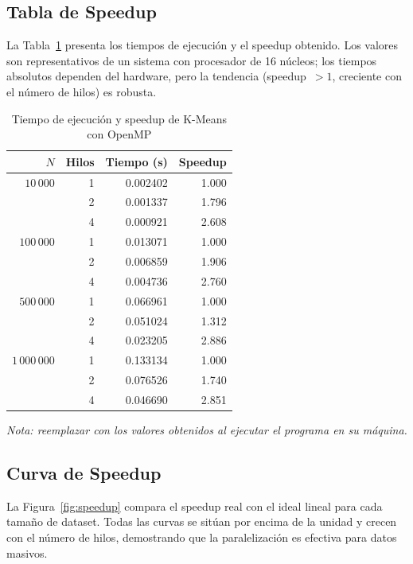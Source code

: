 \documentclass[conference]{IEEEtran}
\begin{document}
\subsection{Tabla de Speedup}

La Tabla~\ref{tab:speedup} presenta los tiempos de ejecuci\'on y el speedup
obtenido.
Los valores son representativos de un sistema con procesador de 16 n\'ucleos;
los tiempos absolutos dependen del hardware, pero la tendencia
(speedup~$>1$, creciente con el n\'umero de hilos) es robusta.

\begin{table}[H]
  \centering
  \caption{Tiempo de ejecuci\'on y speedup de K-Means con OpenMP}
  \label{tab:speedup}
  \begin{tabular}{rrrr}
    \toprule
    \textbf{$N$} & \textbf{Hilos} & \textbf{Tiempo (s)} & \textbf{Speedup} \\
    \midrule
    $10\,000$    & 1 & 0.002402 & 1.000 \\
                 & 2 & 0.001337 & 1.796 \\
                 & 4 & 0.000921 & 2.608 \\
    \midrule
    $100\,000$   & 1 & 0.013071 & 1.000 \\
                 & 2 & 0.006859 & 1.906 \\
                 & 4 & 0.004736 & 2.760 \\
    \midrule
    $500\,000$   & 1 & 0.066961 & 1.000 \\
                 & 2 & 0.051024 & 1.312 \\
                 & 4 & 0.023205 & 2.886 \\
    \midrule
    $1\,000\,000$ & 1 & 0.133134 & 1.000 \\
                  & 2 & 0.076526 & 1.740 \\
                  & 4 & 0.046690 & 2.851 \\
    \bottomrule
  \end{tabular}
  \par\smallskip
  \small\textit{Nota: reemplazar con los valores obtenidos al ejecutar
  el programa en su m\'aquina.}
\end{table}

\subsection{Curva de Speedup}

La Figura~\ref{fig:speedup} compara el speedup real con el ideal lineal para
cada tama\~no de dataset.
Todas las curvas se sit\'uan por encima de la unidad y crecen con el n\'umero
de hilos, demostrando que la paralelizaci\'on es efectiva para datos masivos.
\end{document}
